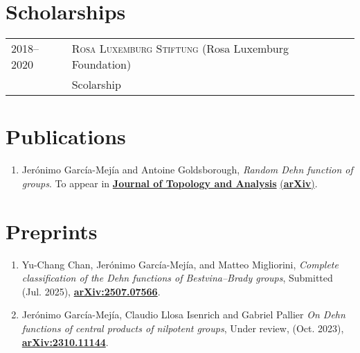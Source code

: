 \documentclass[a4paper,11pt]{article} %
\begin{document}

\section{Scholarships}

\begin{longtable}{>{\raggedleft\arraybackslash}p{4cm}p{10cm}}

\textsc{2018--2020} & \textsc{Rosa Luxemburg Stiftung} \small (Rosa Luxemburg Foundation)\vspace{0.2em}\\
& Scolarship
\end{longtable}



\section{Publications}

\begin{minipage}{15cm}
\begin{enumerate}[align=right, itemsep=.5em, leftmargin=1.8em]
	
	\item Jerónimo García-Mejía and Antoine Goldsborough, \emph{Random Dehn function of groups}. To appear in {\href{https://doi.org/10.1142/S179352532550027X}{\textbf{Journal of Topology and Analysis}}} {\href{https://arxiv.org/abs/2411.12715}{(\textbf{arXiv})}}.
    
\end{enumerate}
\end{minipage}

\section{Preprints}

\begin{minipage}{15cm}
\begin{enumerate}[align=right, itemsep=.5em, leftmargin=1.8em]
	
	\item Yu-Chang Chan, Jerónimo García-Mejía, and Matteo Migliorini, \emph{Complete classification of the Dehn functions of Bestvina--Brady groups}, Submitted (Jul. 2025), {\href{https://arxiv.org/abs/2507.07566}{\textbf{arXiv:2507.07566}}}.
    
    \item Jerónimo García-Mejía, Claudio Llosa Isenrich and Gabriel Pallier \emph{On Dehn functions of central products of nilpotent groups}, Under review,  (Oct. 2023), {\href{https://arxiv.org/abs/2310.11144}{\textbf{arXiv:2310.11144}}}.
    
\end{enumerate}
\end{minipage}
\end{document}
